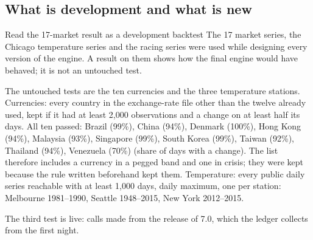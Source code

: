 \documentclass[10.5pt]{article}
\begin{document}
\subsection*{What is development and what is new}
\begin{caution}{Read the 17-market result as a development backtest}
The 17 market series, the Chicago temperature series and the racing series were used while designing every version of the engine. A result on them shows how the final engine would have behaved; it is not an untouched test.

The untouched tests are the ten currencies and the three temperature stations. Currencies: every country in the exchange-rate file other than the twelve already used, kept if it had at least 2,000 observations and a change on at least half its days. All ten passed: Brazil (99\%), China (94\%), Denmark (100\%), Hong Kong (94\%), Malaysia (93\%), Singapore (99\%), South Korea (99\%), Taiwan (92\%), Thailand (94\%), Venezuela (70\%) (share of days with a change). The list therefore includes a currency in a pegged band and one in crisis; they were kept because the rule written beforehand kept them. Temperature: every public daily series reachable with at least 1,000 days, daily maximum, one per station: Melbourne 1981--1990, Seattle 1948--2015, New York 2012--2015.

The third test is live: calls made from the release of 7.0, which the ledger collects from the first night.
\end{caution}
\end{document}
